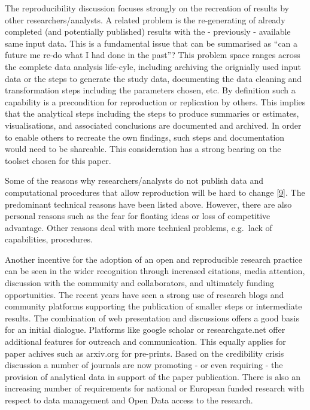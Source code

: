 \documentclass[conference,final,a4paper,]{IEEEtran}
\begin{document}
The reproducibility discussion focuses strongly on the recreation of
results by other researchers/analysts. A related problem is the
re-generating of already completed (and potentially published) results
with the - previously - available same input data. This is a fundamental
issue that can be summarised as ``can a future me re-do what I had done
in the past''? This problem space ranges across the complete data
analysis life-cyle, including archiving the orignially used input data
or the steps to generate the study data, documenting the data cleaning
and transformation steps including the parameters chosen, etc. By
definition such a capability is a precondition for reproduction or
replication by others. This implies that the analytical steps including
the steps to produce summaries or estimates, visualisations, and
associated conclusions are documented and archived. In order to enable
others to recreate the own findings, such steps and documentation would
need to be shareable. This consideration has a strong bearing on the
toolset chosen for this paper.

Some of the reasons why researchers/analysts do not publish data and
computational procedures that allow reproduction will be hard to change
{[}\protect\hyperlink{ref-daniel_nust_2018_2361304}{9}{]}. The
predominant technical reasons have been listed above. However, there are
also personal reasons such as the fear for floating ideas or loss of
competitive advantage. Other reasons deal with more technical problems,
e.g.~lack of capabilities, procedures.

Another incentive for the adoption of an open and reproducible research
practice can be seen in the wider recognition through increased
citations, media attention, discussion with the community and
collaborators, and ultimately funding opportunities. The recent years
have seen a strong use of research blogs and community platforms
supporting the publication of smaller steps or intermediate results. The
combination of web presentation and discussions offers a good basis for
an initial dialogue. Platforms like google scholar or researchgate.net
offer additional features for outreach and communication. This equally
applies for paper achives such as arxiv.org for pre-prints. Based on the
credibility crisis discussion a number of journals are now promoting -
or even requiring - the provision of analytical data in support of the
paper publication. There is also an increasing number of requirements
for national or European funded research with respect to data management
and Open Data access to the research.
\end{document}
